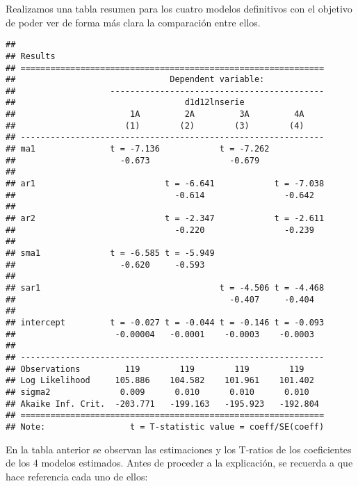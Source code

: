 \documentclass[
]{article}
\begin{document}
Realizamos una tabla resumen para los cuatro modelos definitivos con el
objetivo de poder ver de forma más clara la comparación entre ellos.

\medskip

\begin{verbatim}
## 
## Results
## =============================================================
##                               Dependent variable:            
##                   -------------------------------------------
##                                  d1d12lnserie                
##                       1A         2A         3A         4A    
##                      (1)        (2)        (3)        (4)    
## -------------------------------------------------------------
## ma1               t = -7.136            t = -7.262           
##                     -0.673                -0.679             
##                                                              
## ar1                          t = -6.641            t = -7.038
##                                -0.614                -0.642  
##                                                              
## ar2                          t = -2.347            t = -2.611
##                                -0.220                -0.239  
##                                                              
## sma1              t = -6.585 t = -5.949                      
##                     -0.620     -0.593                        
##                                                              
## sar1                                    t = -4.506 t = -4.468
##                                           -0.407     -0.404  
##                                                              
## intercept         t = -0.027 t = -0.044 t = -0.146 t = -0.093
##                    -0.00004   -0.0001    -0.0003    -0.0003  
##                                                              
## -------------------------------------------------------------
## Observations         119        119        119        119    
## Log Likelihood     105.886    104.582    101.961    101.402  
## sigma2              0.009      0.010      0.010      0.010   
## Akaike Inf. Crit.  -203.771   -199.163   -195.923   -192.804 
## =============================================================
## Note:                 t = T-statistic value = coeff/SE(coeff)
\end{verbatim}

\medskip

En la tabla anterior se observan las estimaciones y los T-ratios de los
coeficientes de los 4 modelos estimados. Antes de proceder a la
explicación, se recuerda a que hace referencia cada uno de ellos:
\end{document}
